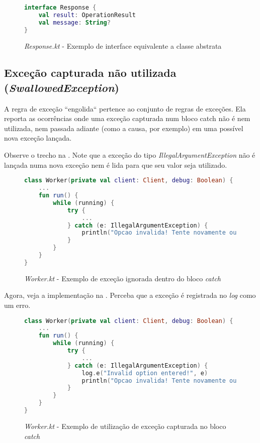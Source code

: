 \begin{figure}[H]
    \centering
    \begin{lstlisting}[language=Kotlin]
interface Response {
    val result: OperationResult
    val message: String?
}
    \end{lstlisting}
    \caption{\textit{Response.kt} - Exemplo de interface equivalente a classe abstrata}
    \label{fig:detekt_unnecessary_abstract_class_after_example}
\end{figure}

\subsection{Exceção capturada não utilizada (\textit{SwallowedException})}

A regra de exceção ``engolida`` pertence ao conjunto de regras de exceções. Ela reporta as ocorrências onde uma exceção capturada num bloco catch não é nem utilizada, nem passada adiante (como a causa, por exemplo) em uma possível nova exceção lançada.

Observe o trecho na . Note que a exceção do tipo \textit{IllegalArgumentException} não é lançada numa nova exceção nem é lida para que seu valor seja utilizado.

\begin{figure}[H]
    \centering
    \begin{lstlisting}[language=Kotlin]
class Worker(private val client: Client, debug: Boolean) {
    ...
    fun run() {
        while (running) {
            try {
                ...
            } catch (e: IllegalArgumentException) {
                println("Opcao invalida! Tente novamente ou pressione Ctrl+D para finalizar.")
            }
        }
    }
}
    \end{lstlisting}
    \caption{\textit{Worker.kt} - Exemplo de exceção ignorada dentro do bloco \textit{catch}}
    \label{fig:detekt_swallowed_exception_before_example}
\end{figure}

Agora, veja a implementação na . Perceba que a exceção é registrada no \textit{log} como um erro.

\begin{figure}[H]
    \centering
    \begin{lstlisting}[language=Kotlin]
class Worker(private val client: Client, debug: Boolean) {
    ...
    fun run() {
        while (running) {
            try {
                ...
            } catch (e: IllegalArgumentException) {
                log.e("Invalid option entered!", e)
                println("Opcao invalida! Tente novamente ou pressione Ctrl+D para finalizar.")
            }
        }
    }
}
    \end{lstlisting}
    \caption{\textit{Worker.kt} - Exemplo de utilização de exceção capturada no bloco \textit{catch}}
    \label{fig:detekt_swallowed_exception_after_example}
\end{figure}

